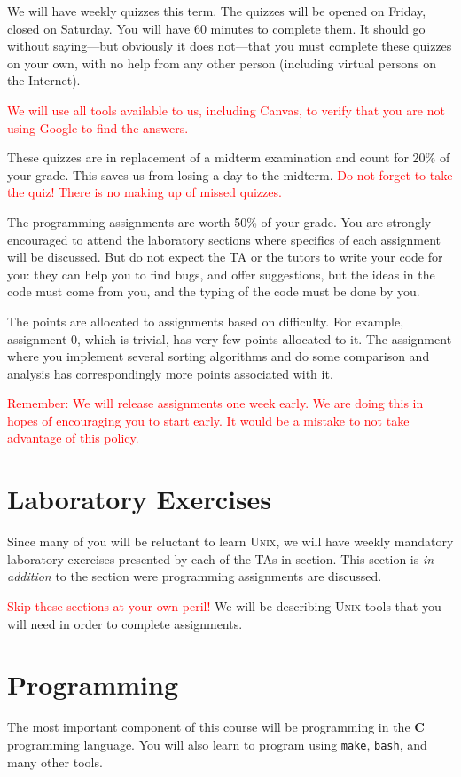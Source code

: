 \documentclass{article}
\begin{document}
We will have weekly quizzes this term. The quizzes will be
opened on Friday, closed on Saturday. You will have 60 minutes to complete them.
It should go without saying---but obviously it does not---that you must
complete these quizzes on your own, with no help from any other person
(including virtual persons on the Internet).

\textcolor{red}{We will use all tools available to us, including
Canvas, to verify that you are not using Google to find the answers.}

These quizzes are in replacement of a midterm examination and count
for 20\% of your grade. This saves us from losing a day to the
midterm.
\textcolor{red}{Do not forget to take the quiz! There is no making up of missed
quizzes.}

The programming assignments are worth 50\% of your grade. You are strongly
encouraged to attend the laboratory sections where specifics of each
assignment will be discussed. But do not expect the TA or the tutors to write
your code for you: they can help you to find bugs, and offer suggestions, but
the ideas in the code must come from you, and the typing of the code must be
done by you.

The points are allocated to assignments based on difficulty. For example,
assignment 0, which is trivial, has very few points allocated to it. The
assignment where you implement several sorting algorithms and do some
comparison and analysis has correspondingly more points associated with it.

\textcolor{red}{Remember: We will release assignments one week early. We are
doing this in hopes of encouraging you to start early. It would be a mistake to
not take advantage of this policy.}

\section{Laboratory Exercises}

Since many of you will be reluctant to learn \textsc{Unix}, we will have weekly
mandatory laboratory exercises presented by each of the TAs in section. This
section is \emph{in addition} to the section were programming assignments are
discussed.

\textcolor{red}{Skip these sections at your own peril!} We will be describing
\textsc{Unix} tools that you will need in order to complete assignments.

\section{Programming}
The most important component of this course will be programming in the
\textbf{C} programming language. You will also learn to program using
\texttt{make}, \texttt{bash}, and many other tools.
\end{document}
